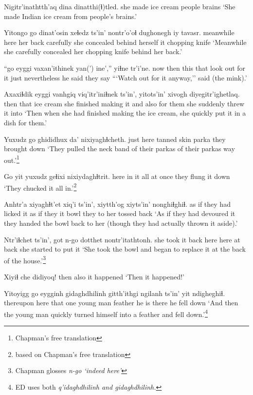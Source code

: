 \documentclass[12pt]{article}
\begin{document}
\gll Nigitr'inathtth'aq  dina dinatthi(ɬ)tled.
{she made ice cream} people brains
\glt `She made Indian ice cream from people's brains.'
\glend

\gll Yitongo go dinat'osin  {xeɬedz ts'in'}  nontr'o'oɬ dughonegh iy tavasr.
meanwhile here {her back} carefully {she concealed} {behind herself} it {chopping knife}
\glt `Meanwhile she carefully concealed her chopping knife behind her back.'
\glend

 ``go eyggi  vaxan'ithinek yan(') ine','' yiɬne tr'i'ne.
{now then} this that {look out for it} just nevertheless {he said} {they say}
\glt ```Watch out for it anyway,'' said (the mink).'
\glend

\gll Axaxiɬdik eyggi vanhgiq viq'itr'iniɬnek ts'in', yitots'in' xivogh diyegitr'ighetlaq.
then  that {ice cream} {she finished making it} and also  {for them} {she suddenly threw it into} 
\glt `Then when she had finished making the ice cream, she quickly put it in a dish for them.'
\glend

\gll Yuxudz go ghididhux da' nixiyaghɬcheth.
just here {tanned skin} parka {they brought down}
\glt `They pulled the neck band of their parkas of their parkas way out.'\footnote{Chapman's free translation}
\glend

\gll Go yit yuxudz geɬixi  nixiydaghɬtrit.
here {in it} all {at once} {they flung it down}
\glt `They chucked it all in.'\footnote{based on Chapman's free translation}
\glend

\gll Anhtr'a xiyaghɬt'et xiq'i  ts'in', xiytth'og xiyts'in' nonghiɬghiɬ.
{as if}  {they had licked it} {as if} {} {they it bowl} {they to her} {tossed back}
\glt `As if they had devoured it they handed the bowl back to her (though they had actually thrown it aside).'
\glend

\gll Ntr'iɬchet ts'in', got n-go dotthet nontr'itathtonh.
{she took it back} {} here here {at back} {she started to put it}
\glt `She took the bowl and began to replace it at the back of the house.'\footnote{Chapman glosses \em n-go \em `indeed here'}
\glend

\gll Xiyiɬ che didiyoq!
then also {it happened}
\glt `Then it happened!'
\glend

\gll Yitoyigg go eygginh gidaghdhilinh gitth'ithgi ngilanh ts'in' yit ndigheghiɬ.
thereupon here {that one} {young man} feather {he is} {} there {he fell down}
\glt `And then the young man quickly turned himself into a feather and fell down.'\footnote{ED uses both \em q'idaghdhilinh \em and \em gidaghdhilinh.}
\glend
\end{document}

